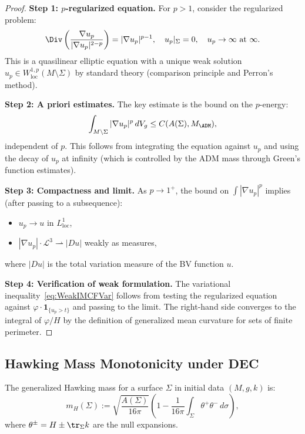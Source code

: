 \begin{proof}
\textbf{Step 1: $p$-regularized equation.}
For $p > 1$, consider the regularized problem:
\begin{equation}
    \Div\left( \frac{\nabla u_p}{|\nabla u_p|^{2-p}} \right) = |\nabla u_p|^{p-1}, \quad u_p|_\Sigma = 0, \quad u_p \to \infty \text{ at } \infty.
\end{equation}
This is a quasilinear elliptic equation with a unique weak solution $u_p \in W^{1,p}_{\mathrm{loc}}(M \setminus \Sigma)$ by standard theory (comparison principle and Perron's method).

\textbf{Step 2: A priori estimates.}
The key estimate is the bound on the $p$-energy:
\begin{equation}
    \int_{M \setminus \Sigma} |\nabla u_p|^p \, dV_g \le C(A(\Sigma), M_{\ADM}),
\end{equation}
independent of $p$. This follows from integrating the equation against $u_p$ and using the decay of $u_p$ at infinity (which is controlled by the ADM mass through Green's function estimates).

\textbf{Step 3: Compactness and limit.}
As $p \to 1^+$, the bound on $\int |\nabla u_p|^p$ implies (after passing to a subsequence):
\begin{itemize}
    \item $u_p \to u$ in $L^1_{\mathrm{loc}}$,
    \item $|\nabla u_p| \cdot \mathcal{L}^3 \rightharpoonup |Du|$ weakly as measures,
\end{itemize}
where $|Du|$ is the total variation measure of the BV function $u$.

\textbf{Step 4: Verification of weak formulation.}
The variational inequality~\eqref{eq:WeakIMCFVar} follows from testing the regularized equation against $\varphi \cdot \mathbf{1}_{\{u_p > t\}}$ and passing to the limit. The right-hand side converges to the integral of $\varphi / H$ by the definition of generalized mean curvature for sets of finite perimeter.
\end{proof}

\subsection{Hawking Mass Monotonicity under DEC}
The generalized Hawking mass for a surface $\Sigma$ in initial data $(M, g, k)$ is:
\begin{equation}
    m_H(\Sigma) := \sqrt{\frac{A(\Sigma)}{16\pi}} \left( 1 - \frac{1}{16\pi} \int_\Sigma \theta^+ \theta^- \, d\sigma \right),
\end{equation}
where $\theta^\pm = H \pm \tr_\Sigma k$ are the null expansions.

